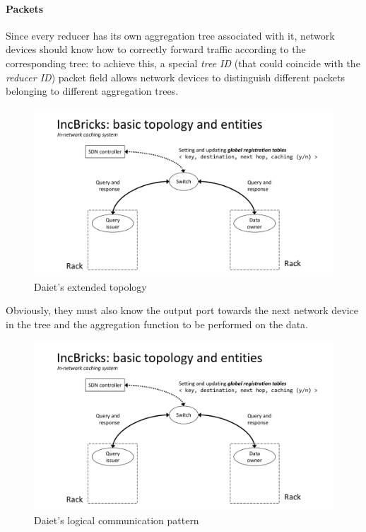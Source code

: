 \paragraph{Packets}
Since every reducer has its own aggregation tree associated with it, network devices should know how to correctly forward traffic according to the corresponding tree: to achieve this, a special \textit{tree ID} (that could coincide with the \textit{reducer ID}) packet field allows network devices to distinguish different packets belonging to different aggregation trees.

\begin{figure}[!htb]
    \centering
        \includegraphics[page=10, clip, trim=0.5cm 0.7cm 1.2cm 2.7cm, width=1.00\textwidth]{figures/analysis/inp/solutions.pdf}
    \caption{Daiet's \texorpdfstring{\cite{daiet}}{} extended topology}
\end{figure}

Obviously, they must also know the output port towards the next network device in the tree and the aggregation function to be performed on the data.

\begin{figure}[!htb]
    \centering
        \includegraphics[page=11, clip, trim=0.35cm 0.6cm 0.3cm 2.7cm, width=1.00\textwidth]{figures/analysis/inp/solutions.pdf}
    \caption{Daiet's \texorpdfstring{\cite{daiet}}{} logical communication pattern}
\end{figure}


